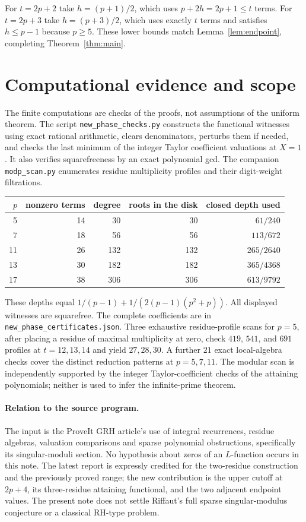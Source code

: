 \documentclass[11pt]{article}
\theoremstyle{remark}\newtheorem{remark}[theorem]{Remark}
\begin{document}
For $t=2p+2$ take $h=(p+1)/2$, which uses $p+2h=2p+1\le t$ terms. For $t=2p+3$ take $h=(p+3)/2$, which uses exactly $t$ terms and satisfies $h\le p-1$ because $p\ge5$. These lower bounds match Lemma~\ref{lem:endpoint}, completing Theorem~\ref{thm:main}.

\section{Computational evidence and scope}
The finite computations are checks of the proofs, not assumptions of the uniform theorem. The script \texttt{new\_phase\_checks.py} constructs the functional witnesses using exact rational arithmetic, clears denominators, perturbs them if needed, and checks the last minimum of the integer Taylor coefficient valuations at $X=1$. It also verifies squarefreeness by an exact polynomial gcd. The companion \texttt{modp\_scan.py} enumerates residue multiplicity profiles and their digit-weight filtrations.

\begin{center}
\begin{tabular}{rrrrr}\toprule
$p$&nonzero terms&degree&roots in the disk&closed depth used\\\midrule
5&14&30&30&$61/240$\\
7&18&56&56&$113/672$\\
11&26&132&132&$265/2640$\\
13&30&182&182&$365/4368$\\
17&38&306&306&$613/9792$\\\bottomrule
\end{tabular}
\end{center}
These depths equal $1/(p-1)+1/(2(p-1)(p^2+p))$. All displayed witnesses are squarefree. The complete coefficients are in \texttt{new\_phase\_certificates.json}. Three exhaustive residue-profile scans for $p=5$, after placing a residue of maximal multiplicity at zero, check $419$, $541$, and $691$ profiles at $t=12,13,14$ and yield $27,28,30$. A further $21$ exact local-algebra checks cover the distinct reduction patterns at $p=5,7,11$. The modular scan is independently supported by the integer Taylor-coefficient checks of the attaining polynomials; neither is used to infer the infinite-prime theorem.

\paragraph{Relation to the source program.}
The input is the ProveIt GRH article's use of integral recurrences, residue algebras, valuation comparisons and sparse polynomial obstructions, specifically its singular-moduli section. No hypothesis about zeros of an $L$-function occurs in this note. The latest report \cite{transport} is expressly credited for the two-residue construction and the previously proved range; the new contribution is the upper cutoff at $2p+4$, its three-residue attaining functional, and the two adjacent endpoint values. The present note does not settle Riffaut's full sparse singular-modulus conjecture or a classical RH-type problem.
\end{document}
